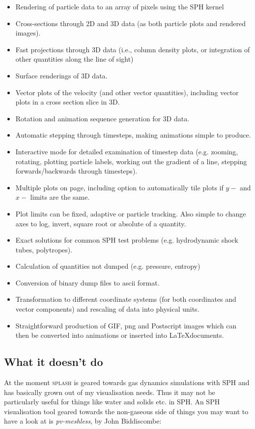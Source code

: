 \documentclass[a4paper,10pt]{article}
\newcommand{\splash}{\textsc{splash }}
\begin{document}
\begin{itemize}
\item Rendering of particle data to an array of pixels using the SPH kernel
\item Cross-sections through 2D and 3D data (as both particle plots and rendered
images).
\item Fast projections through 3D data (i.e., column density plots, or integration of
other quantities along the line of sight)
\item Surface renderings of 3D data.
\item Vector plots of the velocity (and other vector quantities), including vector
plots in a cross section slice in 3D.
\item Rotation and animation sequence generation for 3D data.
\item Automatic stepping through timesteps, making animations simple to produce.
\item Interactive mode for detailed examination of timestep data (e.g. zooming,
rotating, plotting particle labels, working out the gradient of a line, stepping forwards/backwards
through timesteps).
\item Multiple plots on page, including option to automatically tile plots if $y-$ and $x-$ limits
are the same.
\item Plot limits can be fixed, adaptive or particle tracking. Also simple to change
axes to log, invert, square root or absolute of a quantity.
\item Exact solutions for common SPH test problems (e.g. hydrodynamic shock tubes,
polytropes).
\item Calculation of quantities not dumped (e.g. pressure, entropy)
\item Conversion of binary dump files to ascii format.
\item Transformation to different coordinate systems (for both coordinates and
vector components) and rescaling of data into physical units.
\item Straightforward production of GIF, png and Postscript images which can then be
converted into animations or inserted into \LaTeX  documents.
\end{itemize}

\subsection{What it doesn't do}
At the moment \splash is geared towards gas dynamics simulations with SPH and has basically grown out of my visualisation needs.
Thus it may not be particularly useful for things like water and solids etc. in SPH. An SPH visualisation tool geared towards the non-gaseous side of things you may want to have a look at is {\it pv-meshless}, by John Biddiscombe:
\end{document}
